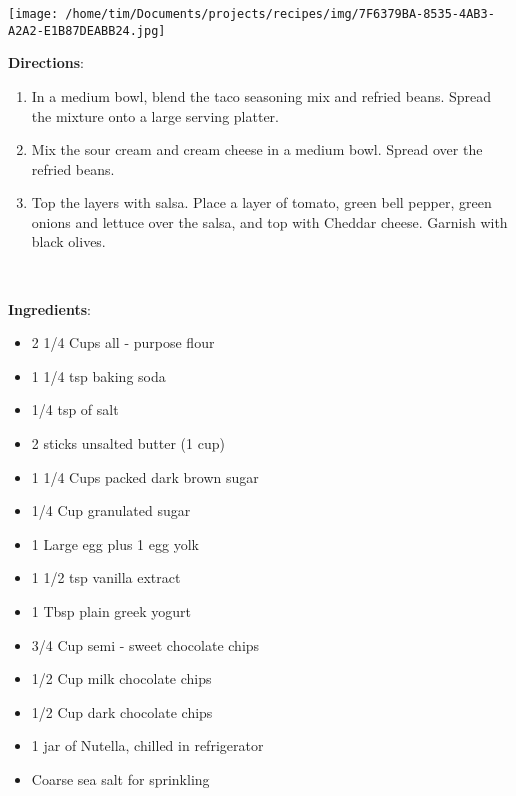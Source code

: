 \documentclass[11pt, twoside, openany]{book}
\begin{document}
\begin{minipage}[t]{0.2\linewidth}
\centering \strut\vspace*{-\baselineskip}\newline
\texttt{[image: /home/tim/Documents/projects/recipes/img/7F6379BA-8535-4AB3-A2A2-E1B87DEABB24.jpg]}\\
\end{minipage}\vspace{3mm}
\textbf{Directions}:
\vspace{-3mm}\begin{enumerate}\setlength\itemsep{-1mm}
\item In a medium bowl, blend the taco seasoning mix and refried beans. Spread the mixture onto a large serving platter.
\item Mix the sour cream and cream cheese in a medium bowl. Spread over the refried beans.
\item Top the layers with salsa. Place a layer of tomato, green bell pepper, green onions and lettuce over the salsa, and top with Cheddar cheese. Garnish with black olives.
\end{enumerate}
 \label{nutella-stuffed-brown-butter-+-sea-salt-chocolate-chip-cookies}\hfill\textit{}\\
\begin{minipage}[t]{0.8\linewidth}
\textbf{Ingredients}:\vspace{-3mm}
\begin{multicols}{2}
\begin{itemize}\setlength\itemsep{-1mm}
\item 2 1/4 Cups all - purpose flour
\item 1 1/4 tsp baking soda
\item 1/4 tsp of salt
\item 2 sticks unsalted butter (1 cup)
\item 1 1/4 Cups packed dark brown sugar
\item 1/4 Cup granulated sugar
\item 1 Large egg plus 1 egg yolk
\item 1 1/2 tsp vanilla extract
\item 1 Tbsp plain greek yogurt
\item 3/4 Cup semi - sweet chocolate chips
\item 1/2 Cup milk chocolate chips
\item 1/2 Cup dark chocolate chips
\item 1 jar of Nutella, chilled in refrigerator
\item Coarse sea salt for sprinkling
\end{itemize}
\end{multicols}
\end{minipage}
\end{document}

